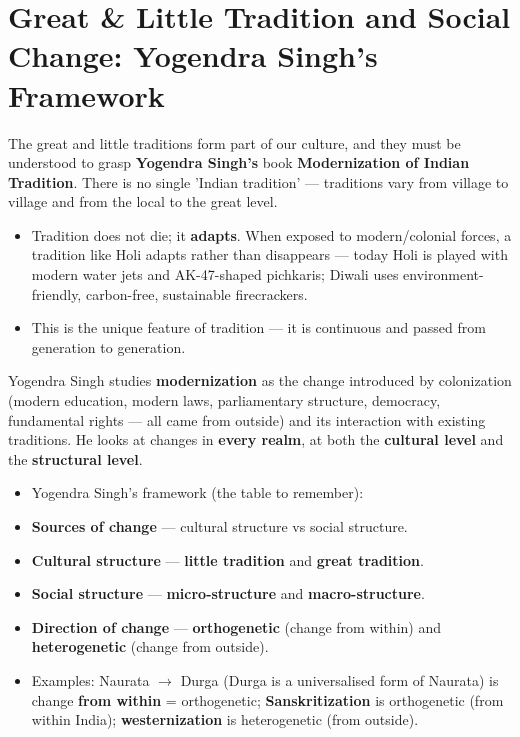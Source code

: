 \section{Great \& Little Tradition and Social Change: Yogendra Singh's Framework}

The great and little traditions form part of our culture, and they must be understood to grasp \textbf{Yogendra Singh's} book \textbf{Modernization of Indian Tradition}. There is no single 'Indian tradition' --- traditions vary from village to village and from the local to the great level.

\begin{KeyConcept}
\begin{itemize}
\item Tradition does not die; it \textbf{adapts}. When exposed to modern/colonial forces, a tradition like Holi adapts rather than disappears --- today Holi is played with modern water jets and AK-47-shaped pichkaris; Diwali uses environment-friendly, carbon-free, sustainable firecrackers.
\item This is the unique feature of tradition --- it is continuous and passed from generation to generation.
\end{itemize}
\end{KeyConcept}

Yogendra Singh studies \textbf{modernization} as the change introduced by colonization (modern education, modern laws, parliamentary structure, democracy, fundamental rights --- all came from outside) and its interaction with existing traditions. He looks at changes in \textbf{every realm}, at both the \textbf{cultural level} and the \textbf{structural level}.

\begin{ComparisonBox}
\begin{itemize}
\item Yogendra Singh's framework (the table to remember):
\item \textbf{Sources of change} --- cultural structure vs social structure.
\item \textbf{Cultural structure} --- \textbf{little tradition} and \textbf{great tradition}.
\item \textbf{Social structure} --- \textbf{micro-structure} and \textbf{macro-structure}.
\item \textbf{Direction of change} --- \textbf{orthogenetic} (change from within) and \textbf{heterogenetic} (change from outside).
\item Examples: Naurata $\rightarrow$ Durga (Durga is a universalised form of Naurata) is change \textbf{from within} = orthogenetic; \textbf{Sanskritization} is orthogenetic (from within India); \textbf{westernization} is heterogenetic (from outside).
\end{itemize}
\end{ComparisonBox}


